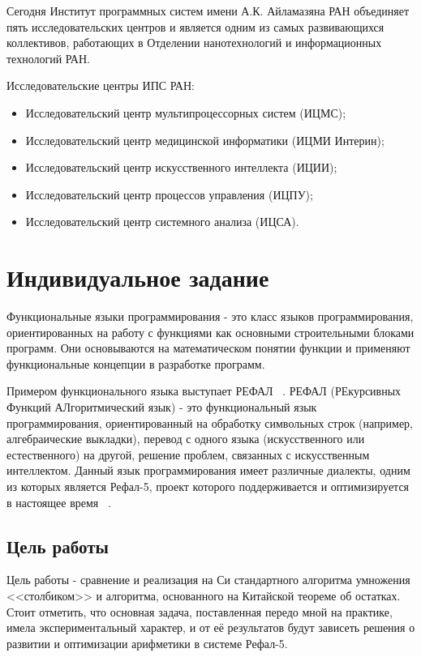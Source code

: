 \documentclass[14pt, russian]{scrartcl}
\begin{document}
Сегодня Институт программных систем имени А.К. Айламазяна РАН объединяет пять исследовательских центров и является одним из самых развивающихся коллективов, работающих в Отделении нанотехнологий и информационных технологий РАН.

Исследовательские центры ИПС РАН:
\begin{itemize}
\item Исследовательский центр мультипроцессорных систем (ИЦМС);
\item Исследовательский центр медицинской информатики (ИЦМИ Интерин);
\item Исследовательский центр искусственного интеллекта (ИЦИИ);
\item Исследовательский центр процессов управления (ИЦПУ);
\item Исследовательский центр системного анализа (ИЦСА).
\end{itemize}
\newpage

\section{Индивидуальное задание}

Функциональные языки программирования - это класс языков программирования, ориентированных на работу с функциями как основными строительными блоками программ. Они основываются на математическом понятии функции и применяют функциональные концепции в разработке программ.
        
Примером функционального языка выступает РЕФАЛ ~\cite{Refal5}. РЕФАЛ (РЕкурсивных Функций АЛгоритмический язык) - это функциональный язык программирования, ориентированный на обработку символьных строк (например, алгебраические выкладки), перевод с одного языка (искусственного или естественного) на другой, решение проблем, связанных с искусственным интеллектом. Данный язык программирования имеет различные диалекты, одним из которых является Рефал-5, проект которого поддерживается и оптимизируется в настоящее время ~\cite{RefalWiki}.

\subsection{Цель работы}
Цель работы - сравнение и  реализация на Си стандартного алгоритма умножения <<столбиком>> и алгоритма, основанного на Китайской теореме об остатках. Стоит отметить, что основная задача, поставленная передо мной на практике, имела экспериментальный характер, и от её результатов будут зависеть решения о развитии и оптимизации арифметики в системе Рефал-5.
\end{document}
